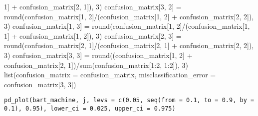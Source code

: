 \documentclass[a4paper]{book}
\begin{document}
\begin{Examples}
\begin{ExampleCode}
{{            1] + confusion_matrix[2, 1]), 3)
        confusion_matrix[3, 2] = round(confusion_matrix[1, 2]/(confusion_matrix[1, 
            2] + confusion_matrix[2, 2]), 3)
        confusion_matrix[1, 3] = round(confusion_matrix[1, 2]/(confusion_matrix[1, 
            1] + confusion_matrix[1, 2]), 3)
        confusion_matrix[2, 3] = round(confusion_matrix[2, 1]/(confusion_matrix[2, 
            1] + confusion_matrix[2, 2]), 3)
        confusion_matrix[3, 3] = round((confusion_matrix[1, 2] + 
            confusion_matrix[2, 1])/sum(confusion_matrix[1:2, 
            1:2]), 3)
        list(confusion_matrix = confusion_matrix, misclassification_error = confusion_matrix[3, 
            3])
    }
  }
\end{ExampleCode}
\end{Examples}
%
\begin{Usage}
\begin{verbatim}
pd_plot(bart_machine, j, levs = c(0.05, seq(from = 0.1, to = 0.9, by = 0.1), 0.95), lower_ci = 0.025, upper_ci = 0.975)
\end{verbatim}
\end{Usage}
%
\begin{Arguments}
\begin{ldescription}
\item[\code{bart\_machine}] 


\item[\code{j}] 


\item[\code{levs}] 


\item[\code{lower\_ci}] 


\item[\code{upper\_ci}] 


\end{ldescription}
\end{Arguments}
%
\end{document}
